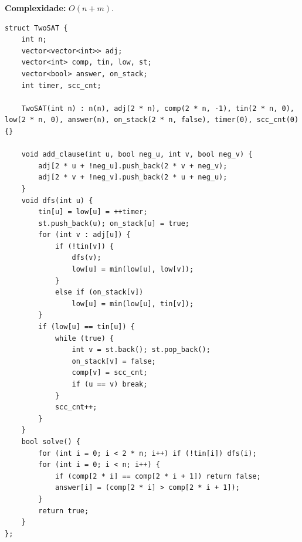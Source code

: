 \textbf{Complexidade:} $O(n + m)$.

\begin{lstlisting}
struct TwoSAT {
    int n;
    vector<vector<int>> adj;
    vector<int> comp, tin, low, st;
    vector<bool> answer, on_stack;
    int timer, scc_cnt;

    TwoSAT(int n) : n(n), adj(2 * n), comp(2 * n, -1), tin(2 * n, 0), low(2 * n, 0), answer(n), on_stack(2 * n, false), timer(0), scc_cnt(0) {}

    void add_clause(int u, bool neg_u, int v, bool neg_v) {
        adj[2 * u + !neg_u].push_back(2 * v + neg_v);
        adj[2 * v + !neg_v].push_back(2 * u + neg_u);
    }
    void dfs(int u) {
        tin[u] = low[u] = ++timer;
        st.push_back(u); on_stack[u] = true;
        for (int v : adj[u]) {
            if (!tin[v]) {
                dfs(v);
                low[u] = min(low[u], low[v]);
            } 
            else if (on_stack[v])
                low[u] = min(low[u], tin[v]);
        }
        if (low[u] == tin[u]) {
            while (true) {
                int v = st.back(); st.pop_back();
                on_stack[v] = false;
                comp[v] = scc_cnt;
                if (u == v) break;
            }
            scc_cnt++;
        }
    }
    bool solve() {
        for (int i = 0; i < 2 * n; i++) if (!tin[i]) dfs(i);
        for (int i = 0; i < n; i++) {
            if (comp[2 * i] == comp[2 * i + 1]) return false;
            answer[i] = (comp[2 * i] > comp[2 * i + 1]);
        }
        return true;
    }
};
\end{lstlisting}